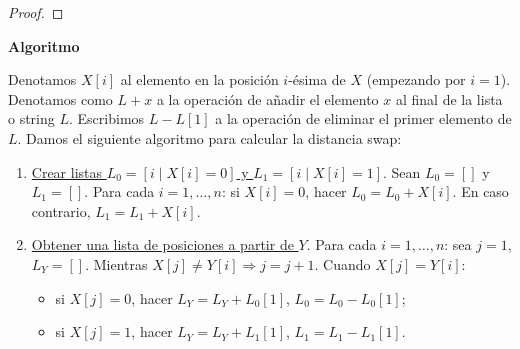 \documentclass[twoside]{article}
\begin{document}
\begin{solucion}
\begin{proof}
\end{proof}

\vspace{0.8cm}

\textbf{Algoritmo}

Denotamos $X[i]$ al elemento en la posición $i$-ésima de $X$ (empezando por $i=1$). Denotamos como $L+x$ a la operación de añadir el elemento $x$ al final de la lista o string $L$. Escribimos $L-L[1]$ a la operación de eliminar el primer elemento de $L$. Damos el siguiente algoritmo para calcular la distancia swap:

\begin{enumerate}

\item \underline{Crear listas $L_0=[i\mid X[i]=0]$ y $L_1=[i\mid X[i]=1]$}. Sean $L_0=[]$ y $L_1=[]$. Para cada $i=1,\dots, n$: si $X[i]=0$, hacer $L_0= L_0+X[i]$. En caso contrario, $L_1= L_1+X[i]$. 



\item \underline{Obtener una lista de posiciones a partir de $Y$}. Para cada $i=1,\dots, n$: sea $j=1$, $L_Y=[]$. Mientras $X[j]\neq Y[i]\Rightarrow j=j+1$. Cuando $X[j]= Y[i]$:
\begin{itemize}
\item si $X[j]=0$, hacer $L_Y= L_Y+L_0[1]$, $L_0= L_0-L_0[1]$;
\item si $X[j]=1$, hacer $L_Y= L_Y+L_1[1]$, $L_1= L_1-L_1[1]$.
\end{itemize}  


\end{enumerate}
\end{solucion}
\end{document}
